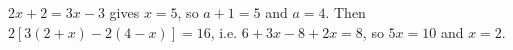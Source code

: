 $2x+2=3x-3$ gives $x=5$, so $a+1=5$ and $a=4$. Then $2\left[3(2+x)-2(4-x)\right]=16$, i.e. $6+3x-8+2x=8$, so $5x=10$ and $x=\boxed{2}$.
